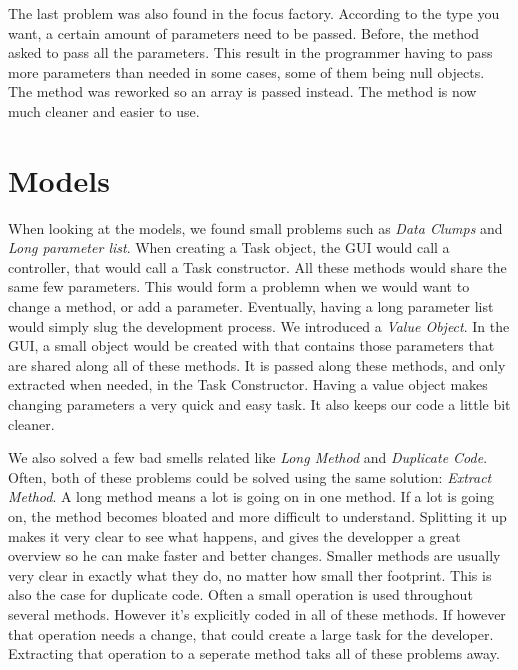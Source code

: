 The last problem was also found in the focus factory. According to the type you want, a certain amount of parameters need to be passed. Before, the method asked to pass all the parameters. This result in the programmer having to pass more parameters than needed in some cases, some of them being null objects. The method was reworked so an array is passed instead. The method is now much cleaner and easier to use.

\section{Models}
When looking at the models, we found small problems such as \emph{Data Clumps}
and \emph{Long parameter list}.
When creating a Task object, the GUI would call a controller, that would call a
Task constructor. All these methods would
share the same few parameters.
This would form a problemn when we would want to change a method, or add a
parameter. Eventually, having a long parameter list would simply slug the
development process.
We introduced a \emph{Value Object}. In the GUI, a small object would be created
with that contains those parameters that are shared along all of these methods.
It is passed along these methods, and only extracted when needed, in the Task
Constructor.
Having a value object makes changing parameters a very quick and easy task. It
also keeps our code a little bit cleaner.

We also solved a few bad smells related like \emph{Long Method} and
\emph{Duplicate Code}. Often, both of these problems could be solved using the
same solution: \emph{Extract Method}.
A long method means a lot is going on in one method. If a lot is going on, the
method becomes bloated and more difficult to understand.
Splitting it up makes it very clear to see what happens, and gives the
developper a great overview so he can make faster and better changes.
Smaller methods are usually very clear in exactly what they do, no matter how
small ther footprint.
This is also the case for duplicate code. Often a small operation is used
throughout several methods. However it's explicitly coded in all of these
methods.
If however that operation needs a change, that could create a large task for the
developer.
Extracting that operation to a seperate method taks all of these problems away.

